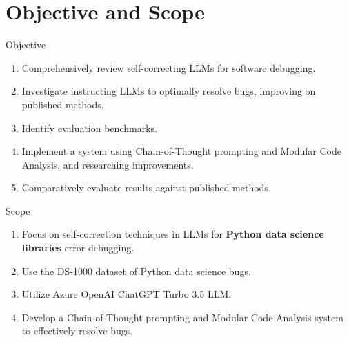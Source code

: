 \section{Objective and Scope}

\begin{frame}{Objective}
    \begin{enumerate}
        \item Comprehensively review self-correcting LLMs for software debugging.

        \item Investigate instructing LLMs to optimally resolve bugs, improving on published methods.

        \item Identify evaluation benchmarks.

        \item Implement a system using Chain-of-Thought prompting and Modular Code Analysis, and researching improvements.

        \item Comparatively evaluate results against published methods.
    \end{enumerate}
\end{frame}

\begin{frame}{Scope}
    \begin{enumerate}
        \item Focus on self-correction techniques in LLMs for \textbf{Python data science libraries} error debugging.

        \item Use the DS-1000 dataset of Python data science bugs.

        \item Utilize Azure OpenAI ChatGPT Turbo 3.5 LLM.

        \item Develop a Chain-of-Thought prompting and Modular Code Analysis system to effectively resolve bugs.
    \end{enumerate}
\end{frame}
